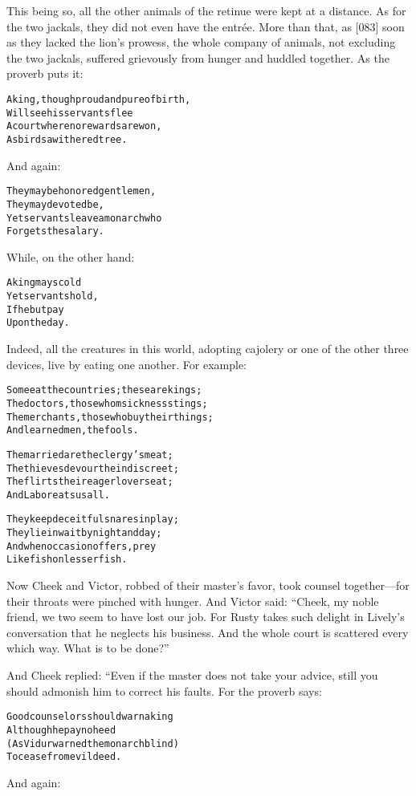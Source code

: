 \documentclass{article}
\renewenvironment{verbatim}{\begin{alltt}\normalfont\begin{centering}}{\end{centering}\end{alltt}}
\begin{document}
This being so, all the other animals of the retinue were kept at a
distance. As for the two jackals, they did not even have the
entrée. More than that, as [083] soon as they lacked the lion's
prowess, the whole company of animals, not excluding the two
jackals, suffered grievously from hunger and huddled together. As
the proverb puts it:

\begin{verbatim}
A king, though proud and pure of birth,
    Will see his servants flee
A court where no rewards are won,
    As birds a withered tree.
\end{verbatim}
And again:

\begin{verbatim}
They may be honored gentlemen,
    They may devoted be,
Yet servants leave a monarch who
    Forgets the salary.
\end{verbatim}
While, on the other hand:

\begin{verbatim}
A king may scold
Yet servants hold,
If he but pay
Upon the day.
\end{verbatim}
Indeed, all the creatures in this world, adopting cajolery or one
of the other three devices, live by eating one another. For
example:

\begin{verbatim}
Some eat the countries; these are kings;
The doctors, those whom sickness stings;
The merchants, those who buy their things;
And learned men, the fools.

The married are the clergy's meat;
The thieves devour the indiscreet;
The flirts their eager lovers eat;
And Labor eats us all.

They keep deceitful snares in play;
They lie in wait by night and day;
And when occasion offers, prey
Like fish on lesser fish.
\end{verbatim}
Now Cheek and Victor, robbed of their master's favor, took counsel
together---for their throats were pinched with hunger. And Victor
said:
``Cheek, my noble friend, we two seem to have lost our job. For Rusty takes such delight in Lively's conversation that he neglects his business. And the whole court is scattered every which way. What is to be done?''

And Cheek replied: “Even if the master does not take your advice,
still you should admonish him to correct his faults. For the
proverb says:

\begin{verbatim}
Good counselors should warn a king
    Although he pay no heed
(As Vidur warned the monarch blind)
    To cease from evil deed.
\end{verbatim}
And again:
\end{document}
